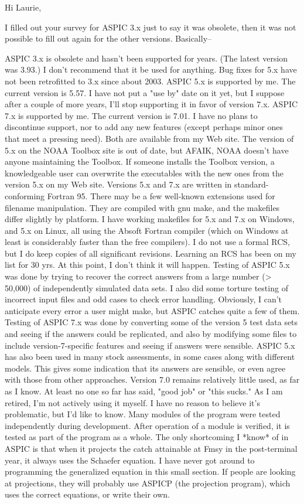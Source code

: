 Hi Laurie,

I filled out your survey for ASPIC 3.x just to say it was obsolete, then it was not possible to fill out again for the other versions. Basically--

    ASPIC 3.x is obsolete and hasn't been supported for years. (The latest version was 3.93.) I don't recommend that it be used for anything. Bug fixes for 5.x have not been retrofitted to 3.x since about 2003.
    ASPIC 5.x is supported by me. The current version is 5.57.  I have not put a "use by" date on it yet, but I suppose after a couple of more years, I'll stop supporting it in favor of version 7.x.
    ASPIC 7.x is supported by me. The current version is 7.01. I have no plans to discontinue support, nor to add any new features (except perhaps minor ones that meet a pressing need).
    Both are available from my Web site. The version of 5.x on the NOAA Toolbox site is out of date, but AFAIK, NOAA doesn't have anyone maintaining the Toolbox. If someone installs the Toolbox version, a knowledgeable user can overwrite the executables with the new ones from the version 5.x on my Web site.
    Versions 5.x and 7.x are written in standard-conforming Fortran 95. There may be a few well-known extensions used for filename manipulation. They are compiled with gnu make, and the makefiles differ slightly by platform. I have working makefiles for 5.x and 7.x on Windows, and 5.x on Linux, all using the Absoft Fortran compiler (which on Windows at least is considerably faster than the free compilers).
    I do not use a formal RCS, but I do keep copies of all significant revisions. Learning an RCS has been on my list for 30 yrs. At this point, I don't think it will happen.
    Testing of ASPIC 5.x was done by trying to recover the correct answers from a large number (> 50,000) of independently simulated data sets. I also did some torture testing of incorrect input files and odd cases to check error handling. Obviously, I can't anticipate every error a user might make, but ASPIC catches quite a few of them.
    Testing of ASPIC 7.x was done by converting some of the version 5 test data sets and seeing if the answers could be replicated, and also by modifying some files to include version-7-specific features and seeing if answers were sensible.
    ASPIC 5.x has also been used in many stock assessments, in some cases along with different models. This gives some indication that its answers are sensible, or even agree with those from other approaches.
    Version 7.0 remains relatively little used, as far as I know. At least no one so far has said, "good job" or "this sucks." As I am retired, I'm not actively using it myself. I have no reason to believe it's problematic, but I'd like to know.
    Many modules of the program were tested independently during development. After operation of a module is verified, it is tested as part of the program as a whole.
    The only shortcoming I *know* of in ASPIC is that when it projects the catch attainable at Fmsy in the post-terminal year, it always uses the Schaefer equation. I have never got around to programming the generalized equation in this small section. If people are looking at projections, they will probably use ASPICP (the projection program), which uses the correct equations, or write their own.

